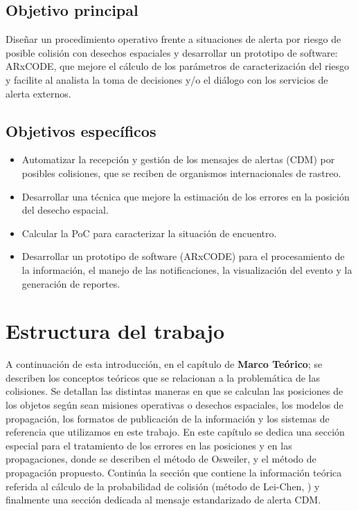 \subsection*{Objetivo principal}
Dise\~nar un procedimiento operativo frente a situaciones de alerta por riesgo de posible
colisi\'on con desechos espaciales y desarrollar un prototipo de software: ARxCODE, que
mejore el c\'alculo de los par\'ametros de caracterizaci\'on del riesgo y facilite al analista la
toma de decisiones y/o el di\'alogo con los servicios de alerta externos.\\

\subsection*{Objetivos espec\'ificos}
\begin{itemize}
\item Automatizar la recepci\'on y gesti\'on de los mensajes de alertas (CDM) por posibles
colisiones, que se reciben de organismos internacionales de rastreo.
\item Desarrollar una t\'ecnica que mejore la estimaci\'on de los errores en la posici\'on del desecho espacial.
\item Calcular la \ac{PoC} para caracterizar la situaci\'on de encuentro.
\item Desarrollar un prototipo de software (ARxCODE) para el procesamiento de la informaci\'on, el manejo de las notificaciones, la visualizaci\'on del evento y la generaci\'on de reportes.
\end{itemize}

\section{Estructura del trabajo}

A continuaci\'on de esta introducci\'on, en el cap\'itulo de {\bf{Marco Te\'orico}}; se describen los conceptos te\'oricos que se relacionan a la problem\'atica de las colisiones. Se detallan las distintas maneras en que se calculan las posiciones de los objetos seg\'un sean misiones operativas o desechos espaciales, los modelos de propagaci\'on, los formatos de publicaci\'on de la informaci\'on y los sistemas de referencia que utilizamos en este trabajo. En este cap\'itulo se dedica una secci\'on especial para el tratamiento de los errores en las posiciones y en las propagaciones, donde se describen el m\'etodo de Osweiler, \citep{osweiler} y el m\'etodo de propagaci\'on propuesto. Contin\'ua la secci\'on que contiene la informaci\'on te\'orica referida al c\'alculo de la probabilidad de colisi\'on (m\'etodo de Lei-Chen, \citep{leichen}) y finalmente una secci\'on dedicada al mensaje estandarizado de alerta \ac{CDM}.

